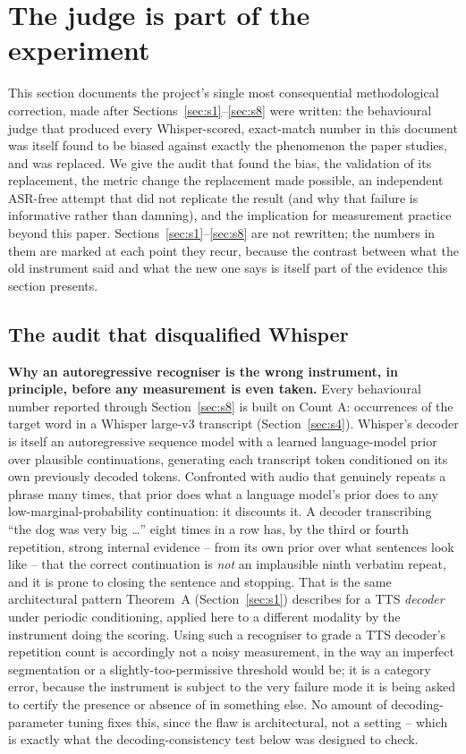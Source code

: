 \documentclass[11pt]{article}
\begin{document}
\section{The judge is part of the experiment}
\label{sec:s9}

This section documents the project's single most consequential
methodological correction, made after Sections~\ref{sec:s1}--\ref{sec:s8}
were written: the behavioural judge that produced every Whisper-scored,
exact-match number in this document was itself found to be biased against
exactly the phenomenon the paper studies, and was replaced. We give the
audit that found the bias, the validation of its replacement, the metric
change the replacement made possible, an independent ASR-free attempt that
did not replicate the result (and why that failure is informative rather
than damning), and the implication for measurement practice beyond this
paper. Sections~\ref{sec:s1}--\ref{sec:s8} are not rewritten; the numbers in
them are marked at each point they recur, because the contrast between what
the old instrument said and what the new one says is itself part of the
evidence this section presents.

\subsection{The audit that disqualified Whisper}
\label{sec:s9-audit}

\textbf{Why an autoregressive recogniser is the wrong instrument, in
principle, before any measurement is even taken.} Every behavioural number
reported through Section~\ref{sec:s8} is built on Count A: occurrences of the
target word in a Whisper large-v3 transcript (Section~\ref{sec:s4}).
Whisper's decoder is itself an autoregressive sequence model with a learned
language-model prior over plausible continuations, generating each
transcript token conditioned on its own previously decoded tokens.
Confronted with audio that genuinely repeats a phrase many times, that prior
does what a language model's prior does to any low-marginal-probability
continuation: it discounts it. A decoder transcribing ``the dog was very big
\ldots{}'' eight times in a row has, by the third or fourth repetition,
strong internal evidence -- from its own prior over what sentences look like
-- that the correct continuation is \emph{not} an implausible ninth verbatim
repeat, and it is prone to closing the sentence and stopping. That is the
same architectural pattern Theorem~A (Section~\ref{sec:s1}) describes for a
TTS \emph{decoder} under periodic conditioning, applied here to a different
modality by the instrument doing the scoring. Using such a recogniser to
grade a TTS decoder's repetition count is accordingly not a noisy
measurement, in the way an imperfect segmentation or a slightly-too-permissive
threshold would be; it is a category error, because the instrument is
subject to the very failure mode it is being asked to certify the presence
or absence of in something else. No amount of decoding-parameter tuning
fixes this, since the flaw is architectural, not a setting -- which is
exactly what the decoding-consistency test below was designed to check.
\end{document}
